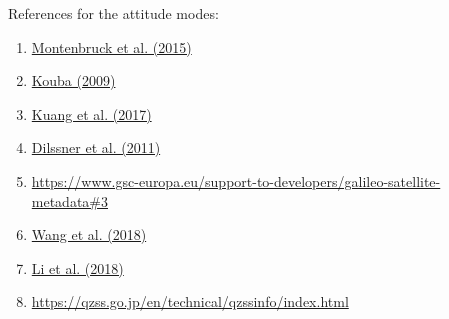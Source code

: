 References for the attitude modes:
\begin{enumerate}
\item \href{https://doi.org/10.1016/j.asr.2015.06.019}{Montenbruck et al. (2015)}
\item \href{https://doi.org/10.1007/s10291-008-0092-1}{Kouba (2009)}
\item \href{https://doi.org/10.1007/s10291-016-0562-9}{Kuang et al. (2017)}
\item \href{https://doi.org/10.1016/j.asr.2010.09.007}{Dilssner et al. (2011)}
\item \url{https://www.gsc-europa.eu/support-to-developers/galileo-satellite-metadata#3}
\item \href{https://doi.org/10.1007/s10291-018-0783-1}{Wang et al. (2018)}
\item \href{https://doi.org/10.1017/S0373463318000103}{Li et al. (2018)}
\item \url{https://qzss.go.jp/en/technical/qzssinfo/index.html}
\end{enumerate}


